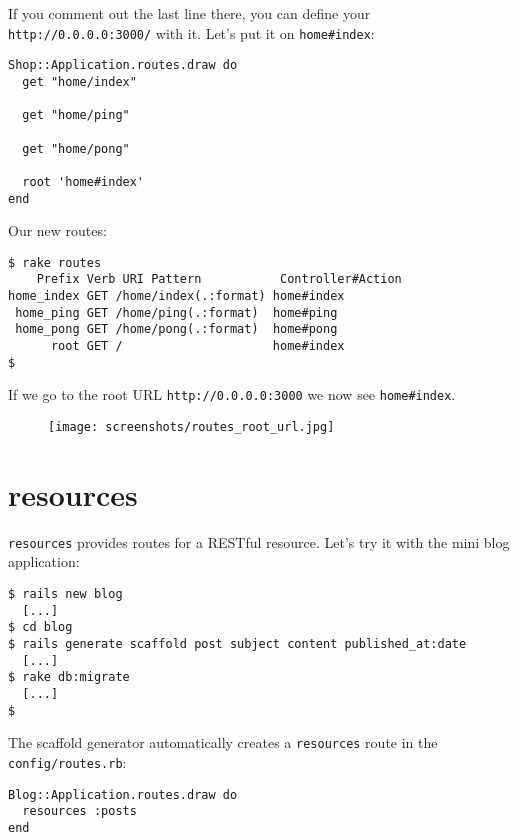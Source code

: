 \documentclass[a4paper]{book}
\begin{document}
If you comment out the last line there, you can define your \texttt{http://0.0.0.0:3000/} with it. Let's put it on \texttt{home\#index}:

\begin{shaded}\begin{verbatim}
Shop::Application.routes.draw do
  get "home/index"

  get "home/ping"

  get "home/pong"

  root 'home#index'
end
\end{verbatim}\end{shaded}

Our new routes:

\begin{shaded}\begin{verbatim}
$ rake routes
    Prefix Verb URI Pattern           Controller#Action
home_index GET /home/index(.:format) home#index
 home_ping GET /home/ping(.:format)  home#ping
 home_pong GET /home/pong(.:format)  home#pong
      root GET /                     home#index
$
\end{verbatim}\end{shaded}

If we go to the root URL \texttt{http://0.0.0.0:3000} we now see \texttt{home\#index}.

\begin{figure}[htbp]
\centering
\texttt{[image: screenshots/routes\_root\_url.jpg]}
\end{figure}

\section{resources}\label{resources}

\texttt{resources} provides routes for a RESTful resource. Let's try it with the mini blog application:

\begin{shaded}\begin{verbatim}
$ rails new blog
  [...]
$ cd blog
$ rails generate scaffold post subject content published_at:date
  [...]
$ rake db:migrate
  [...]
$
\end{verbatim}\end{shaded}

The scaffold generator automatically creates a \texttt{resources} route in the \texttt{config/routes.rb}:

\begin{shaded}\begin{verbatim}
Blog::Application.routes.draw do
  resources :posts
end
\end{verbatim}\end{shaded}
\end{document}
